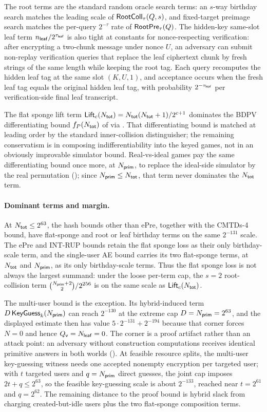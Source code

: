 The root terms are the standard random oracle search terms: an $s$-way
birthday search matches the leading scale of
$\mathsf{RootColl}_\tau(Q,s)$, and fixed-target preimage search matches the per-query
$2^{-\tau}$ rate of $\mathsf{RootPre}_\tau(Q)$. The hidden-key same-slot leaf term
$n_{\mathsf{leaf}}/2^{\tau_{\mathsf{leaf}}}$ is also tight at constants for nonce-respecting
verification: after encrypting a two-chunk message under nonce $U$, an
adversary can submit non-replay verification queries that replace the leaf
ciphertext chunk by fresh strings of the same length while keeping the root
tag. Each query recomputes the hidden leaf tag at the same slot $(K,U,1)$,
and acceptance occurs when the fresh leaf tag equals the original hidden leaf
tag, with probability $2^{-\tau_{\mathsf{leaf}}}$ per verification-side final leaf
transcript.

The flat sponge lift term
$\mathsf{Lift}_c(N_{\mathsf{tot}})=N_{\mathsf{tot}}(N_{\mathsf{tot}}+1)/2^{c+1}$ dominates the BDPV differentiating
bound $f_P(N_{\mathsf{tot}})$ of \cite[Lemma~5]{BDPV08} via . That
differentiating bound is matched at leading order by the standard
inner-collision distinguisher; the remaining conservatism is in composing
indifferentiability into the keyed games, not in an obviously improvable
simulator bound. Real-vs-ideal games pay the same differentiating bound once
more, at $N_{\mathsf{prim}}$, to replace the ideal-side simulator by the real permutation
(); since $N_{\mathsf{prim}} \leq N_{\mathsf{tot}}$, that term never
dominates the $N_{\mathsf{tot}}$ term.

\paragraph{Dominant terms and margin.}
At $N_{\mathsf{tot}} \leq 2^{63}$, the hash bounds other than ePre, together with the
CMTDs-4 bound, have flat-sponge and root or leaf birthday terms on the same
$2^{-131}$ scale. The ePre and \textsf{INT-RUP} bounds retain the flat sponge
loss as their only birthday-scale term, and the single-user AE bound carries
its two flat-sponge terms, at $N_{\mathsf{tot}}$ and $N_{\mathsf{prim}}$, as its only birthday-scale
terms. Thus the flat sponge loss is not always the largest summand: under the
loose per-term cap, the $s=2$ root-collision term
$\binom{N_{\mathsf{prim}}+2}{2}/2^{256}$ is on the same scale as $\mathsf{Lift}_c(N_{\mathsf{tot}})$.

The multi-user bound is the exception. Its hybrid-induced term
$D\,\mathsf{KeyGuess}_k(N_{\mathsf{prim}})$ can reach $2^{-130}$ at the extreme cap
$D=N_{\mathsf{prim}}=2^{63}$, and the displayed estimate then has value
$5 \cdot 2^{-131} + 2^{-194}$ because that corner forces $N=0$ and hence
$Q_{\mathsf{v}}=N_{\mathsf{leaf}}=0$. The corner is a proof artifact rather than an attack point:
an adversary without construction computations receives identical primitive
answers in both worlds (). At feasible resource splits,
the multi-user key-guessing witness needs one accepted nonempty encryption per
targeted user; with $t$ targeted users and $q=N_{\mathsf{prim}}$ direct guesses, the
joint cap imposes $2t+q \leq 2^{63}$, so the feasible key-guessing scale is
about $2^{-133}$, reached near $t=2^{61}$ and $q=2^{62}$.
The remaining distance to the proof bound is
hybrid slack from charging created-but-idle users plus the two flat-sponge
composition terms.

